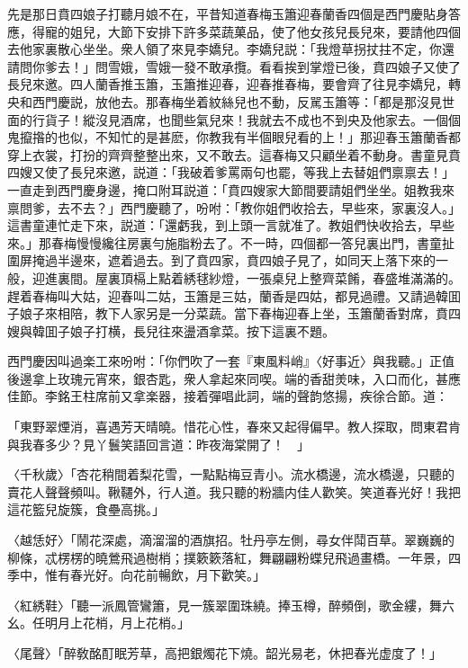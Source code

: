 先是那日賁四娘子打聽月娘不在，平昔知道春梅玉簫迎春蘭香四個是西門慶貼身答應，得寵的姐兒，大節下安排下許多菜蔬菓品，使了他女孩兒長兒來，要請他四個去他家裏散心坐坐。衆人領了來見李嬌兒。李嬌兒説：「我燈草拐扙拄不定，你還請問你爹去！」問雪娥，雪娥一發不敢承攬。看看挨到掌燈已後，賁四娘子又使了長兒來邀。四人蘭香推玉簫，玉簫推迎春，迎春推春梅，要會齊了往見李嬌兒，轉央和西門慶説，放他去。那春梅坐着紋絲兒也不動，反駡玉簫等：「都是那沒見世面的行貨子！縱沒見酒席，也聞些氣兒來！我就去不成也不到央及他家去。一個個鬼攛揝的也似，不知忙的是甚麽，你教我有半個眼兒看的上！」那迎春玉簫蘭香都穿上衣裳，打扮的齊齊整整出來，又不敢去。這春梅又只顧坐着不動身。書童見賁四嫂又使了長兒來邀，説道：「我破着爹罵兩句也罷，等我上去替姐們禀禀去！」一直走到西門慶身邊，掩口附耳説道：「賁四嫂家大節間要請姐們坐坐。姐教我來禀問爹，去不去？」西門慶聽了，吩咐：「教你姐們收拾去，早些來，家裏沒人。」這書童連忙走下來，説道：「還虧我，到上頭一言就准了。教姐們快收拾去，早些來。」那春梅慢慢纔往房裏勻施脂粉去了。不一時，四個都一答兒裏出門，書童扯圍屏掩過半邊來，遮着過去。到了賁四家，賁四娘子見了，如同天上落下來的一般，迎進裏間。屋裏頂槅上點着綉毬紗燈，一張桌兒上整齊菜餚，春盛堆滿滿的。趕着春梅叫大姑，迎春叫二姑，玉簫是三姑，蘭香是四姑，都見過禮。又請過韓囬子娘子來相陪，教下人家另是一分菜蔬。當下春梅迎春上坐，玉簫蘭香對席，賁四嫂與韓囬子娘子打横，長兒往來盪酒拿菜。按下這裏不題。

西門慶因叫過楽工來吩咐：「你們吹了一套『東風料峭』〈好事近〉與我聽。」正值後邊拿上玫瑰元宵來，銀杏匙，衆人拿起來同喫。端的香甜羙味，入口而化，甚應佳節。李銘王柱席前又拿楽器，接着彈唱此詞，端的聲韵悠揚，疾徐合節。道：

「東野翠煙消，喜遇芳天晴曉。惜花心性，春來又起得偏早。教人探取，問東君肯與我春多少？見丫鬟笑語回言道：昨夜海棠開了！　」

〈千秋歲〉「杏花稍間着梨花雪，一點點梅豆青小。流水橋邊，流水橋邊，只聽的賣花人聲聲頻叫。鞦韆外，行人道。我只聽的粉牆内佳人歡笑。笑道春光好！我把這花籃兒旋簇，食壘高挑。」

〈越恁好〉「鬧花深處，滴溜溜的酒旗招。牡丹亭左側，尋女伴鬦百草。翠巍巍的柳條，忒楞楞的曉鶯飛過樹梢；撲簌簌落紅，舞翩翩粉蝶兒飛過畫橋。一年景，四季中，惟有春光好。向花前暢飲，月下歡笑。」

〈紅綉鞋〉「聽一派鳳管鸞簫，見一簇翠圍珠繞。捧玉樽，醉頻倒，歌金縷，舞六幺。任明月上花梢，月上花梢。」

〈尾聲〉「醉敎酩酊眠芳草，高把銀燭花下燒。韶光易老，休把春光虚度了！」

